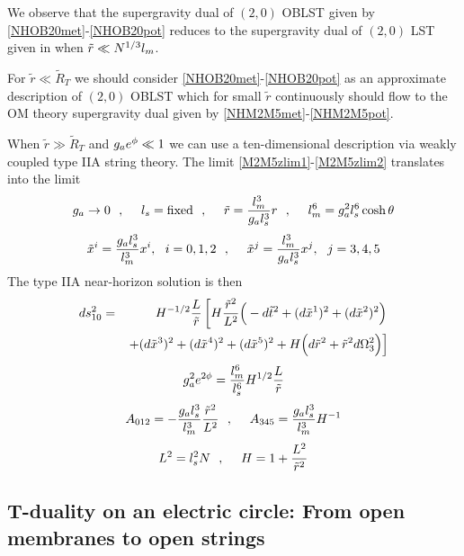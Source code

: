 \documentclass[a4paper,twoside,titlepage,12pt]{article}
\begin{document}
We observe that the supergravity dual of $(2,0)$ OBLST given by 
\eqref{NHOB20met}-\eqref{NHOB20pot}
reduces to the supergravity dual of $(2,0)$ LST given in 
\cite{Itzhaki:1998dd,Aharony:1998ub} when $\tilde{r} \ll N^{1/3} l_m$. 

For \( \tilde{r} \ll \tilde{R}_T \) we should 
consider \eqref{NHOB20met}-\eqref{NHOB20pot}
as an approximate description of $(2,0)$ OBLST which 
for small $\tilde{r}$ continuously should flow to the OM theory 
supergravity dual given by \eqref{NHM2M5met}-\eqref{NHM2M5pot}.

When \( \tilde{r} \gg \tilde{R}_T \) and \( g_a e^{\phi} \ll 1 \)
we can use a ten-dimensional description
via weakly coupled type IIA string theory.
The limit \eqref{M2M5zlim1}-\eqref{M2M5zlim2} translates into the
limit
%
\begin{equation}
\label{D2NS5lim1}
g_a \rightarrow 0 \ \ ,\ \ \ \ 
l_s = \mbox{fixed} \ \ ,\ \ \ \ 
\tilde{r} = \frac{l_m^3}{g_a l_s^3} r \ \ ,\ \ \ \ 
l_m^6 = g_a^2 l_s^6 \cosh \theta
\end{equation}
%
\begin{equation}
\label{D2NS5lim2}
\tilde{x}^i = \frac{g_a l_s^3}{l_m^3} x^i, \ \ i=0,1,2 \ \ ,\ \ \ \ 
\tilde{x}^j = \frac{l_m^3}{g_a l_s^3} x^j,\ \ j=3,4,5 
\end{equation}
%
The type IIA near-horizon solution is then
%
\begin{eqnarray}
ds_{10}^2 &=& H^{-1/2} \frac{L}{\tilde{r}} \left[
H \frac{\tilde{r}^2}{L^2} \Big( -d\tilde{t}^2 
+ (d\tilde{x}^1)^2 + (d\tilde{x}^2)^2 \Big)
\right. \nonumber \\ && \left.
+ (d\tilde{x}^3)^2 + (d\tilde{x}^4)^2 + (d\tilde{x}^5)^2 
+ H \Big( d\tilde{r}^2 + \tilde{r}^2 d\Omega_3^2 \Big) \right]
\end{eqnarray}
%
\begin{equation}
g_a^2 e^{2\phi} = \frac{l_m^6}{l_s^6} H^{1/2} \frac{L}{\tilde{r}}
\end{equation}
%
\begin{equation}
A_{012} = - \frac{g_a l_s^3}{l_m^3} \frac{\tilde{r}^2}{L^2}
\ \ ,\ \ \ \ 
A_{345} = \frac{g_a l_s^3}{l_m^3} H^{-1}
\end{equation}
%
\begin{equation}
L^2 = l_s^2 N \ \ ,\ \ \ \ 
H = 1 + \frac{L^2}{\tilde{r}^2}
\end{equation}
%

\subsection{T-duality on an electric circle: From open membranes 
to open strings}
\label{secTdual}
\end{document}
